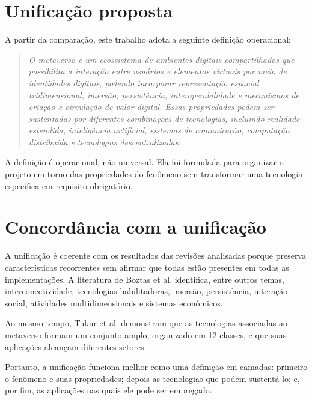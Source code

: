\section{Unificação proposta}

A partir da comparação, este trabalho adota a seguinte definição operacional:

\begin{quote}
\textit{O metaverso é um ecossistema de ambientes digitais compartilhados que possibilita a interação entre usuários e elementos virtuais por meio de identidades digitais, podendo incorporar representação espacial tridimensional, imersão, persistência, interoperabilidade e mecanismos de criação e circulação de valor digital. Essas propriedades podem ser sustentadas por diferentes combinações de tecnologias, incluindo realidade estendida, inteligência artificial, sistemas de comunicação, computação distribuída e tecnologias descentralizadas.}
\end{quote}

A definição é operacional, não universal. Ela foi formulada para organizar o projeto em torno das propriedades do fenômeno sem transformar uma tecnologia específica em requisito obrigatório.

\section{Concordância com a unificação}

A unificação é coerente com os resultados das revisões analisadas porque preserva características recorrentes sem afirmar que todas estão presentes em todas as implementações. A literatura de Boztas et al. identifica, entre outros temas, interconectividade, tecnologias habilitadoras, imersão, persistência, interação social, atividades multidimensionais e sistemas econômicos. \cite{boztas2025}

Ao mesmo tempo, Tukur et al. demonstram que as tecnologias associadas ao metaverso formam um conjunto amplo, organizado em 12 classes, e que suas aplicações alcançam diferentes setores. \cite{tukur2024}

Portanto, a unificação funciona melhor como uma definição em camadas: primeiro o fenômeno e suas propriedades; depois as tecnologias que podem sustentá-lo; e, por fim, as aplicações nas quais ele pode ser empregado.
